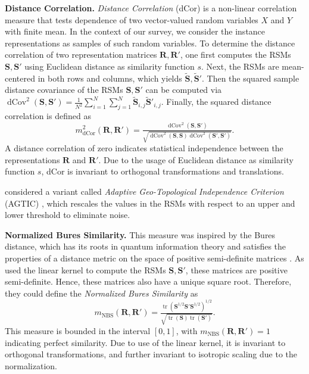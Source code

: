 \documentclass{article}
\newcommand{\citet}{\textcite}
\newcommand{\R}{\bm{R}}
\newcommand{\Rp}{\bm{R'}}
\newcommand{\Sm}{\bm{S}}
\newcommand{\Smp}{\bm{S'}}
\newcommand{\subheader}{\textbf}
\begin{document}
\subheader{Distance Correlation.}
\emph{Distance Correlation} (dCor) \cite{szekely_measuring_2007} is a non-linear correlation measure that tests dependence of two vector-valued random variables $X$ and $Y$ with finite mean.
In the context of our survey, we consider the instance representations as samples of such random variables.
To determine the distance correlation of two representation matrices $\R, \Rp$, one first computes the RSMs $\Sm, \Smp$ using Euclidean distance as similarity function $s$.
Next, the RSMs are mean-centered in both rows and columns, which yields $\widetilde{\Sm}, \widetilde{\Sm}'$.
Then the squared sample distance covariance of the RSMs $\Sm,\Smp$ can be computed via $\operatorname{dCov}^2(\Sm,\Smp)=\tfrac{1}{N^2}\textstyle\sum_{i=1}^N\textstyle\sum_{j=1}^N \widetilde{\Sm}_{i, j} \widetilde{\Sm}'_{i,j}.$
Finally, the squared distance correlation is defined as
\begin{equation}
    m_{\operatorname{dCor}}^2(\R, \Rp)=\tfrac{\operatorname{dCov}^2(\Sm, \Smp)}{\sqrt{\operatorname{dCov}^2(\Sm, \Sm) \operatorname{dCov}^2(\Smp, \Smp)}}.
\end{equation}
A distance correlation of zero indicates statistical independence between the representations $\R$ and $\Rp$.
Due to the usage of Euclidean distance as similarity function $s$, dCor is invariant to orthogonal transformations and translations.

\citet{lin_geometric_2022} considered a variant called \emph{Adaptive Geo-Topological Independence Criterion} (AGTIC) \cite{lin_adaptive_2020}, which rescales the values in the RSMs with respect to an upper and lower threshold to eliminate noise.



\subheader{Normalized Bures Similarity.}
This measure was inspired by the Bures distance, which has its roots in quantum information theory \cite{bures_extension_1969} and satisfies the properties of a distance metric on the space of positive semi-definite matrices \cite{bhatia_bures-wasserstein_2017}.
As \citet{tang_similarity_2020} used the linear kernel to compute the RSMs $\Sm, \Smp$, these matrices are positive semi-definite.
Hence, these matrices also have a unique square root.
Therefore, they could define the \emph{Normalized Bures Similarity} as
\begin{equation}\label{eq:nbs}
    m_{\text{NBS}}(\R, \Rp)= \tfrac{\operatorname{tr}(\Sm^{1/2}\Smp \Sm^{1/2})^{1/2}}{\sqrt{\operatorname{tr}(\Sm)\operatorname{tr}(\Smp)}}.
\end{equation}
This measure is bounded in the interval $[0,1]$, with $m_{\text{NBS}}(\R, \Rp) = 1$ indicating perfect similarity.
Due to use of the linear kernel, it is invariant to orthogonal transformations, and further invariant to isotropic scaling due to the normalization.
\end{document}
